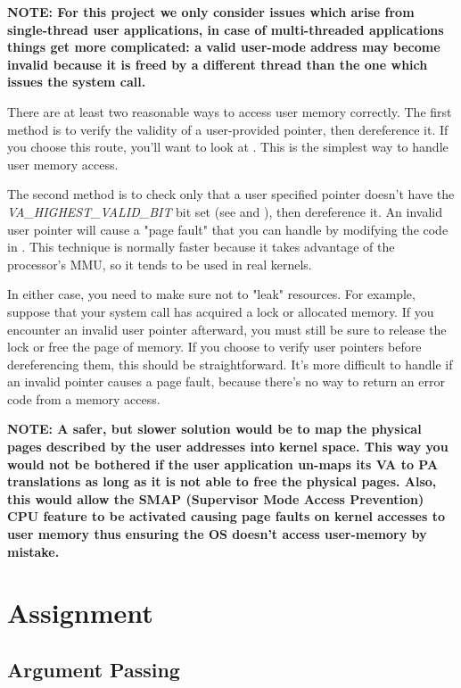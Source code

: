 \textbf{NOTE: For this project we only consider issues which arise from single-thread user
applications, in case of multi-threaded applications things get more complicated: a valid user-mode
address may become invalid because it is freed by a different thread than the one which issues the
system call.}

There are at least two reasonable ways to access user memory correctly. The first method is to
verify the validity of a user-provided pointer, then dereference it. If you choose this route, 
you'll want to look at . This is the simplest way to handle user memory
access.

The second method is to check only that a user specified pointer doesn't have the 
\textit{VA\_HIGHEST\_VALID\_BIT} bit set (see  and
), then dereference it.
An invalid user pointer will cause a "page fault" that you can handle by modifying the code in
. This technique is normally faster because it takes advantage of the
processor's MMU, so it tends to be used in real kernels.

In either case, you need to make sure not to "leak" resources. For example, suppose that your system
call has acquired a lock or allocated memory. If you encounter an invalid user pointer afterward,
you must still be sure to release the lock or free the page of memory. If you choose to verify user
pointers before dereferencing them, this should be straightforward. It’s more difficult to handle
if an invalid pointer causes a page fault, because there’s no way to return an error code from a
memory access.

\textbf{NOTE: A safer, but slower solution would be to map the physical pages described by the user
addresses into kernel space. This way you would not be bothered if the user application un-maps its
VA to PA translations as long as it is not able to free the physical pages. Also, this would allow
the SMAP (Supervisor Mode Access Prevention) CPU feature to be activated causing page faults on
kernel accesses to user memory thus ensuring the OS doesn't access user-memory by mistake.}

\section{Assignment}

\subsection{Argument Passing}

